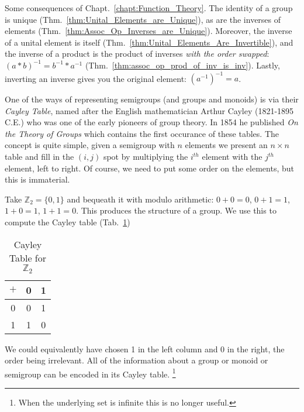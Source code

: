         Some consequences of Chapt.~\ref{chapt:Function_Theory}. The identity of
        a group is unique (Thm.~\ref{thm:Unital_Elements_are_Unique}), as are
        the inverses of elements (Thm.~\ref{thm:Assoc_Op_Inverses_are_Unique}).
        Moreover, the inverse of a unital element is itself
        (Thm.~\ref{thm:Unital_Elements_Are_Invertible}), and the inverse of a
        product is the product of inverses \textit{with the order swapped}:
        $(a*b)^{\minus{1}}=b^{\minus{1}}*a^{\minus{1}}$
        (Thm.~\ref{thm:assoc_op_prod_of_inv_is_inv}). Lastly, inverting
        an inverse gives you the original element:
        $(a^{\minus{1}})^{\minus{1}}=a$.
        \par\hfill\par
        One of the ways of representing semigroups (and groups and monoids) is
        via their \textit{Cayley Table}, named after the
        English mathematician Arthur Cayley (1821-1895 C.E.)%
         who was one of the early pioneers of group
        theory. In 1854 he published \textit{On the Theory of Groups} which
        contains the first occurance of these tables. The concept is quite
        simple, given a semigroup with $n$ elements we present an $n\times{n}$
        table and fill in the $(i,j)$ spot by multiplying the $i^{th}$ element
        with the $j^{th}$ element, left to right. Of course, we need to put some
        order on the elements, but this is immaterial.
        \begin{example}
            Take $\mathbb{Z}_{2}=\{0,1\}$ and bequeath it with modulo
            arithmetic: $0+0=0$, $0+1=1$, $1+0=1$, $1+1=0$. This produces the
            structure of a group. We use this to compute the Cayley table
            (Tab.~\ref{tab:Cayley_Table_Z2})
            \begin{table}[H]
                \centering
                \captionsetup{type=table}
                \begin{tabular}{c|cc}
                    $+$&0&1\\
                    \hline
                    0&0&1\\
                    1&1&0
                \end{tabular}
                \caption{Cayley Table for $\mathbb{Z}_{2}$}
                \label{tab:Cayley_Table_Z2}
            \end{table}
            We could equivalently have chosen 1 in the left column and 0 in the
            right, the order being irrelevant. All of the information about a
            group or monoid or semigroup can be encoded in its Cayley table.%
            \footnote{%
                When the underlying set is infinite this is no longer useful.
            }
        \end{example}
